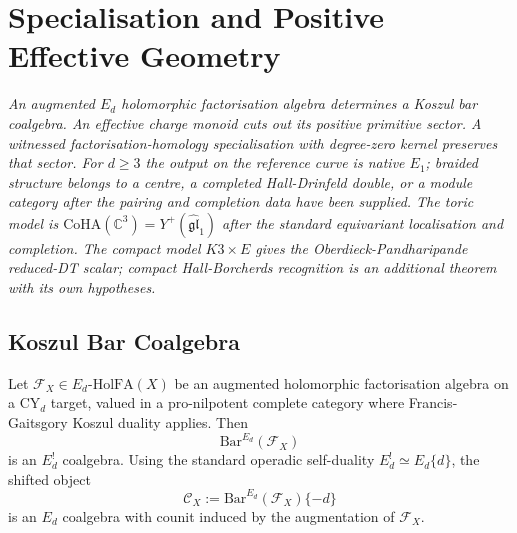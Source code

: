 \providecommand{\kBKM}{\kappa_{\mathrm{BKM}}}
\providecommand{\kch}{\kappa_{\mathrm{ch}}}
\providecommand{\kcat}{\kappa_{\mathrm{cat}}}
\providecommand{\kfib}{\kappa_{\mathrm{fiber}}}
\providecommand{\kHeis}{\kappa_{\mathrm{ch}}^{\mathrm{Heis}}}
\providecommand{\HolFA}{\mathrm{HolFA}}
\providecommand{\SpCh}{\mathrm{SpCh}}
\providecommand{\PhiFA}{\Phi^{\mathrm{FA}}}
\providecommand{\CoHA}{\mathrm{CoHA}}
\providecommand{\DT}{\mathrm{DT}}
\providecommand{\Prim}{\mathrm{Prim}}
\providecommand{\ZZ}{\mathbb{Z}}
\providecommand{\CC}{\mathbb{C}}
\providecommand{\cF}{\mathcal{F}}
\providecommand{\cK}{\mathcal{K}}
\providecommand{\cO}{\mathcal{O}}
\providecommand{\cC}{\mathcal{C}}
\providecommand{\fg}{\mathfrak{g}}
\providecommand{\fgl}{\mathfrak{gl}}
\providecommand{\Lie}{\mathrm{Lie}}
\providecommand{\coLie}{\mathrm{coLie}}
\providecommand{\Yplus}{Y^{+}}
\providecommand{\Dfive}{D_5}
\providecommand{\DeltaFive}{\Delta_5}
\providecommand{\PhiTenOP}{\Phi_{10}^{\mathrm{OP}}}
\providecommand{\PhiTenUn}{\Phi_{10}^{\mathrm{un}}}
\providecommand{\wt}{\mathrm{wt}}

\section{Specialisation and Positive Effective Geometry}
\label{wn:sec:Sp-selects-pos-geom}

\emph{An augmented $E_d$ holomorphic factorisation algebra determines a
Koszul bar coalgebra. An effective charge monoid cuts out its positive
primitive sector. A witnessed factorisation-homology specialisation with
degree-zero kernel preserves that sector. For $d \geq 3$ the output on
the reference curve is native $E_1$; braided structure belongs to a
centre, a completed Hall-Drinfeld double, or a module category after
the pairing and completion data have been supplied. The toric model is
$\CoHA(\CC^3)=\Yplus(\widehat{\fgl}_1)$ after the standard equivariant
localisation and completion. The compact model $K3\times E$ gives the
Oberdieck-Pandharipande reduced-DT scalar; compact Hall-Borcherds
recognition is an additional theorem with its own hypotheses.}

\subsection{Koszul Bar Coalgebra}
\label{wn:subsec:koszul-coalgebra}

\begin{proposition}
\label{wn:prop:Ed-hFA-bar-coalgebra}
Let $\cF_X\in E_d\text{-}\HolFA(X)$ be an augmented holomorphic
factorisation algebra on a CY$_d$ target, valued in a pro-nilpotent
complete category where Francis-Gaitsgory Koszul duality applies. Then
\[
 \mathrm{Bar}^{E_d}(\cF_X)
\]
is an $E_d^!$ coalgebra. Using the standard operadic self-duality
$E_d^!\simeq E_d\{d\}$, the shifted object
\[
 \cC_X:=\mathrm{Bar}^{E_d}(\cF_X)\{-d\}
\]
is an $E_d$ coalgebra with counit induced by the augmentation of
$\cF_X$.
\end{proposition}

